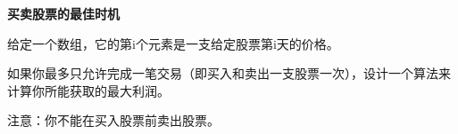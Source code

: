 \textbf{买卖股票的最佳时机}\par

给定一个数组，它的第i个元素是一支给定股票第i天的价格。\par

如果你最多只允许完成一笔交易（即买入和卖出一支股票一次），设计一个算法来计算你所能获取的最大利润。\par

注意：你不能在买入股票前卖出股票。\par

